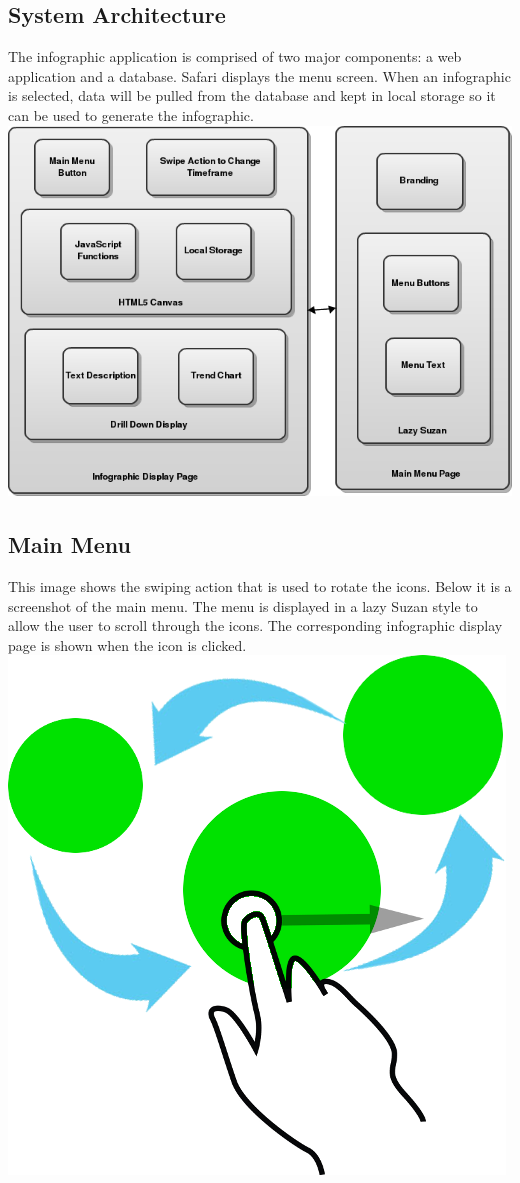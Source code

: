 \documentclass[11pt,a4paper,oneside]{article}
\begin{document}
\subsection{System Architecture}
The infographic application is comprised of two major components: a web application and a database. Safari displays the menu screen. When an infographic is selected, data will be pulled from the database and kept in local storage so it can be used to generate the infographic.\\

\includegraphics[width=.9\textwidth]{images/Capstone_-_System_Architecture_Diagram.png}\\   
\newpage
\subsection {Main Menu}
This image shows the swiping action that is used to rotate the icons.  Below it is a screenshot of the main menu.  The menu is displayed in a lazy Suzan style to allow the user to scroll through the icons.  The corresponding infographic display page is shown when the icon is clicked.\\

\includegraphics[width=.4\textwidth]{images/switcheroo.png}\\
\end{document}
